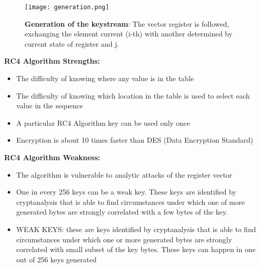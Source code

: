 \documentclass{article}
\begin{document}
\newpage
\begin{figure}[htb]
	\begin{center}
  		\texttt{[image: generation.png]}
 	\end{center}
 	\caption{\textbf{Generation of the keystream}: The vector register is followed, exchanging the element current (i-th) with another determined by current state of register and j.}
 	\label{ciphering}
\end{figure}
\textbf{RC4 Algorithm Strengths: }
\begin{itemize}
\item The difficulty of knowing where any value is in the table
\item The difficulty of knowing which location in the table is used to select each value in the sequence
\item A particular RC4 Algorithm key can be used only once
\item Encryption is about 10 times faster than DES (Data Encryption Standard)
\end{itemize}
\textbf{RC4 Algorithm Weakness: }
\begin{itemize}
\item The algorithm is vulnerable to analytic attacks of the register vector
\item One in every 256 keys can be a weak key. These keys are identified by cryptanalysis that is able to find circumstances under which one of more generated bytes are strongly correlated with a few bytes of the key. 
\item WEAK KEYS: these are keys identified by cryptanalysis that is able to find circumstances under which one or more generated bytes are strongly correlated with small subset of the key bytes. These keys can happen in one out of 256 keys generated
\end{itemize}

\end{document}
